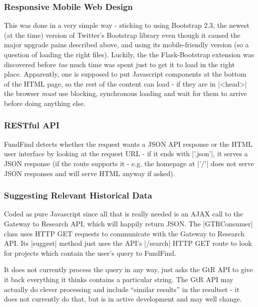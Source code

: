 \subsubsection{Responsive Mobile Web Design}
\label{impl-mobile}
This was done in a very simple way - sticking to using Bootstrap 2.3, the newest (at the time) version of Twitter's Bootstrap library even though it caused the major upgrade pains described above, and using its mobile-friendly version (so a question of loading the right files). Luckily, the the Flask-Bootstrap \cite{flask-bootstrap} extension was discovered before \emph{too} much time was spent just to get it to load in the right place. Apparently, one is supposed to put Javascript components at the bottom of the HTML page, so the rest of the content can load - if they are in |<head>| the browser \emph{must} use blocking, synchronous loading and wait for them to arrive before doing anything else.

\subsubsection{RESTful API}
\label{impl-api}

FundFind detects whether the request wants a JSON API response or the HTML user interface by looking at the request URL - if it ends with |'.json'|, it serves a JSON response (if the route supports it - e.g. the homepage at |'/'| does not serve JSON responses and will serve HTML anyway if asked).

\subsubsection{Suggesting Relevant Historical Data}

Coded as pure Javascript since all that is really needed is an AJAX call to the Gateway to Research API, which will happily return JSON. The |GTRConsumer| class uses HTTP GET requests to communicate with the Gateway to Research API. Its |suggest| method just uses the API's |/search| HTTP GET route to look for projects which contain the user's query to FundFind.

It does not currently process the query in any way, just asks the GtR API to give it back everything it thinks contains a particular string. The GtR API may actually do clever processing and include ``similar results'' in the resultset - it does not currently do that, but is in active development and may well change.

